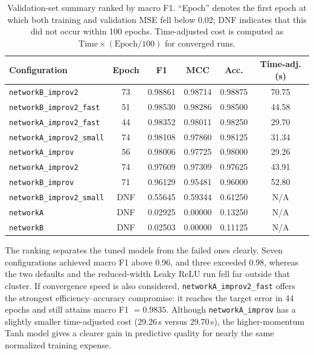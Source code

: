 \documentclass{acm_proc_article-sp}
\begin{document}
\begin{table}[ht]
\centering
\small
\caption{Validation-set summary ranked by macro F1.  ``Epoch'' denotes
the first epoch at which both training and validation MSE fell below
0.02; DNF indicates that this did not occur within 100 epochs.
Time-adjusted cost is computed as $\text{Time}\times(\text{Epoch}/100)$
for converged runs.}
\label{tab:scores}
\renewcommand{\arraystretch}{1.1}
\begin{tabular}{lccccc}
\toprule
Configuration & Epoch & F1 & MCC & Acc. & Time-adj. (s) \\
\midrule
\texttt{networkB\_improv2}        & 73  & 0.98861 & 0.98714 & 0.98875 & 70.75 \\
\texttt{networkB\_improv2\_fast}  & 51  & 0.98530 & 0.98286 & 0.98500 & 44.58 \\
\texttt{networkA\_improv2\_fast}  & 44  & 0.98352 & 0.98011 & 0.98250 & 29.70 \\
\texttt{networkA\_improv2\_small} & 74  & 0.98108 & 0.97860 & 0.98125 & 31.34 \\
\texttt{networkA\_improv}         & 56  & 0.98006 & 0.97725 & 0.98000 & 29.26 \\
\texttt{networkA\_improv2}        & 74  & 0.97609 & 0.97309 & 0.97625 & 43.91 \\
\texttt{networkB\_improv}         & 71  & 0.96129 & 0.95481 & 0.96000 & 52.80 \\
\texttt{networkB\_improv2\_small} & DNF & 0.55645 & 0.59344 & 0.61250 & N/A   \\
\texttt{networkA}                 & DNF & 0.02925 & 0.00000 & 0.13250 & N/A   \\
\texttt{networkB}                 & DNF & 0.02503 & 0.00000 & 0.11125 & N/A   \\
\bottomrule
\end{tabular}
\end{table}

\begin{sloppypar}
The ranking separates the tuned models from the failed ones clearly.
Seven configurations achieved macro F1 above 0.96, and three exceeded
0.98, whereas the two defaults and the reduced-width Leaky ReLU run fell
far outside that cluster. If convergence speed is also considered,
\texttt{networkA\_improv2\_fast} offers the strongest
efficiency--accuracy compromise: it reaches the target error in 44
epochs and still attains macro F1 $=0.9835$. Although
\texttt{networkA\_improv} has a slightly smaller time-adjusted cost
(29.26\,s versus 29.70\,s), the higher-momentum Tanh model gives a
clearer gain in predictive quality for nearly the same normalized
training expense.
\end{sloppypar}
\end{document}
